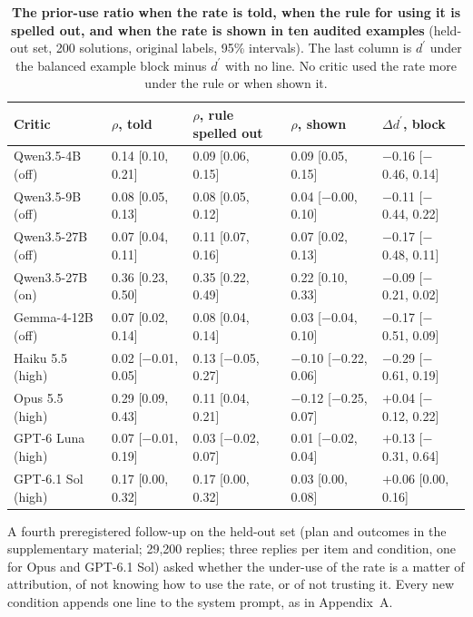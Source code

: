 \documentclass[letterpaper]{article} %
\newcommand{\dprime}{d^{\prime}}
\begin{document}
\begin{table}[t]
\centering
\scriptsize
\begin{tabular}{@{}l@{\hspace{4pt}}l@{\hspace{4pt}}l@{\hspace{4pt}}l@{\hspace{4pt}}l@{}}
\toprule
Critic & $\rho$, told & $\rho$, rule spelled out & $\rho$, shown & $\Delta\dprime$, block \\
\midrule
Qwen3.5-4B (off) & 0.14 [0.10, 0.21] & 0.09 [0.06, 0.15] & 0.09 [0.05, 0.15] & $-$0.16 [$-$0.46, 0.14] \\
Qwen3.5-9B (off) & 0.08 [0.05, 0.13] & 0.08 [0.05, 0.12] & 0.04 [$-$0.00, 0.10] & $-$0.11 [$-$0.44, 0.22] \\
Qwen3.5-27B (off) & 0.07 [0.04, 0.11] & 0.11 [0.07, 0.16] & 0.07 [0.02, 0.13] & $-$0.17 [$-$0.48, 0.11] \\
Qwen3.5-27B (on) & 0.36 [0.23, 0.50] & 0.35 [0.22, 0.49] & 0.22 [0.10, 0.33] & $-$0.09 [$-$0.21, 0.02] \\
Gemma-4-12B (off) & 0.07 [0.02, 0.14] & 0.08 [0.04, 0.14] & 0.03 [$-$0.04, 0.10] & $-$0.17 [$-$0.51, 0.09] \\
Haiku 5.5 (high) & 0.02 [$-$0.01, 0.05] & 0.13 [$-$0.05, 0.27] & $-$0.10 [$-$0.22, 0.06] & $-$0.29 [$-$0.61, 0.19] \\
Opus 5.5 (high) & 0.29 [0.09, 0.43] & 0.11 [0.04, 0.21] & $-$0.12 [$-$0.25, 0.07] & $+$0.04 [$-$0.12, 0.22] \\
GPT-6 Luna (high) & 0.07 [$-$0.01, 0.19] & 0.03 [$-$0.02, 0.07] & 0.01 [$-$0.02, 0.04] & $+$0.13 [$-$0.31, 0.64] \\
GPT-6.1 Sol (high) & 0.17 [0.00, 0.32] & 0.17 [0.00, 0.32] & 0.03 [0.00, 0.08] & $+$0.06 [0.00, 0.16] \\
\bottomrule
\end{tabular}
\caption{\textbf{The prior-use ratio when the rate is told, when the rule for using it is spelled out, and when the rate is shown in ten audited examples} (held-out set, 200 solutions, original labels, 95\% intervals). The last column is $\dprime$ under the balanced example block minus $\dprime$ with no line. No critic used the rate more under the rule or when shown it.}
\label{tab:followup}
\end{table}

A fourth preregistered follow-up on the held-out set (plan and outcomes in the supplementary material; 29,200 replies; three replies per item and condition, one for Opus and GPT-6.1 Sol) asked whether the under-use of the rate is a matter of attribution, of not knowing how to use the rate, or of not trusting it. Every new condition appends one line to the system prompt, as in Appendix~A.
\end{document}

